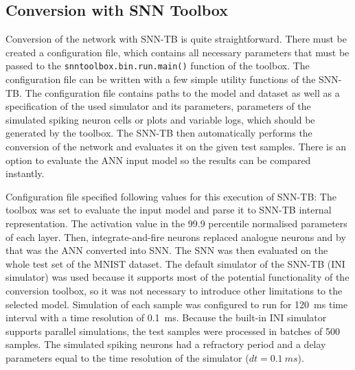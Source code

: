 \subsection{Conversion with SNN Toolbox}
Conversion of the network with SNN-TB is quite straightforward. There must be created a configuration file, which contains all necessary parameters that must be passed to the \texttt{snntoolbox.bin.run.main()} function of the toolbox. The configuration file can be written with a few simple utility functions of the SNN-TB. The configuration file contains paths to the model and dataset as well as a specification of the used simulator and its parameters, parameters of the simulated spiking neuron cells or plots and variable logs, which should be generated by the toolbox. The SNN-TB then automatically performs the conversion of the network and evaluates it on the given test samples. There is an option to evaluate the ANN input model so the results can be compared instantly. \par
Configuration file specified following values for this execution of SNN-TB: The toolbox was set to evaluate the input model and parse it to SNN-TB internal representation. The activation value in the 99.9 percentile normalised parameters of each layer. Then, integrate-and-fire neurons replaced analogue neurons and by that was the ANN converted into SNN. The SNN was then evaluated on the whole test set of the MNIST dataset. The default simulator of the SNN-TB (INI simulator) was used because it supports most of the potential functionality of the conversion toolbox, so it was not necessary to introduce other limitations to the selected model. Simulation of each sample was configured to run for 120~ms time interval with a time resolution of 0.1~ms. Because the built-in INI simulator supports parallel simulations, the test samples were processed in batches of 500 samples. The simulated spiking neurons had a refractory period and a delay parameters equal to the time resolution of the simulator ($dt=0.1~ms$).\par

